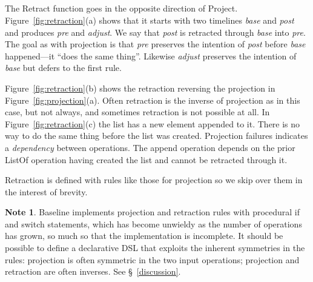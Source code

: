 \documentclass[english,submission]{programming}
\theoremstyle{definition}
\newtheorem*{note}{Note}
\providecommand{\DIFadd}[1]{{\protect\color{blue}\uwave{#1}}} %
\providecommand{\DIFaddbegin}{} %
\providecommand{\DIFaddend}{} %
\begin{document}
\DIFaddbegin \subsection{\DIFadd{Retraction}}

\DIFaddend The \textsf{Retract} function goes in the opposite direction of \textsf{Project}. Figure~\ref{fig:retraction}(a) shows that it starts with two timelines \textit{base} and \textit{post} and produces \textit{pre} and \textit{adjust}. We say that \textit{post} is retracted through \textit{base} into \textit{pre}. The goal as with projection is that \textit{pre} preserves the intention of \textit{post} before \textit{base} happened---it ``does the same thing''. Likewise \textit{adjust} preserves the intention of \textit{base} but defers to the first rule.

Figure~\ref{fig:retraction}(b) shows the retraction reversing the projection in Figure~\ref{fig:projection}(a). Often retraction is the inverse of projection as in this case, but not always, and sometimes retraction is not possible at all. In Figure~\ref{fig:retraction}(c) the list has a new element appended to it. There is no way to do the same thing before the list was created. Projection failures indicates a \textit{dependency} between operations. The \textsf{append} operation depends on the prior \textsf{ListOf} operation having created the list and cannot be retracted through it.

Retraction is defined with rules like those for projection so we skip over them in the interest of brevity.
\begin{note}
  Baseline implements projection and retraction rules with procedural if and switch statements, which has become unwieldy as the number of operations has grown, so much so that the implementation is incomplete. It should be possible to define a declarative DSL that exploits the inherent symmetries in the rules: projection is often symmetric in the two input operations; projection and retraction are often inverses. See \S~\ref{discussion}.
\end{note}
\end{document}
